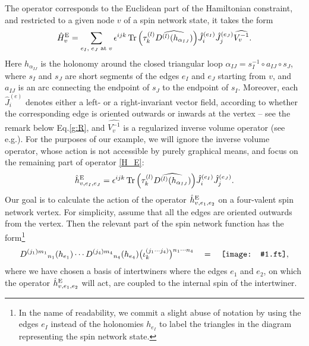 \documentclass[graybox, secnum]{svmult}
\makeatletter
\newcommand{\ft}{pdf}        %
\newcommand{\makeSymbol}[1]{\mathord{\vcenter{\hbox{#1}}}}
\newcommand{\Symbol}[1]{\makeSymbol{\texttt{[image: \#1.\\ft]}}}
\newcommand{\eg}{e.g.\@\xspace}
\newcommand{\Eq}[1]{Eq.\@\xspace\eqref{#1}}
\newcommand{\DD}[4]{{D^{(#1)#2}}_{#3}(#4)}
\makeatother
\begin{document}
The operator corresponds to the Euclidean part of the Hamiltonian constraint, and restricted to a given node $v$ of a spin network state, it takes the form
\begin{equation}
	\hat H^{\rm E}_v = \sum_{\text{$e_I$, $e_J$ at $v$}} \epsilon^{ijk}\,{\rm Tr}\,\Bigl(\tau_k^{(l)}\widehat{D^{(l)}(h_{\alpha_{IJ}})}\Bigr)\hat J_i^{(e_I)}\hat J_j^{(e_J)}\widehat{V_v^{-1}}.
	\label{H_E}
\end{equation}
Here $h_{\alpha_{IJ}}$ is the holonomy around the closed triangular loop $\alpha_{IJ} = s_I^{-1}\circ a_{IJ}\circ s_J$, where $s_I$ and $s_J$ are short segments of the edges $e_I$ and $e_J$ starting from $v$, and $a_{IJ}$ is an arc connecting the endpoint of $s_J$ to the endpoint of $s_I$. Moreover, each $\hat J_i^{(e)}$ denotes either a left- or a right-invariant vector field, according to whether the corresponding edge is oriented outwards or inwards at the vertex -- see the remark below \Eq{g:R}, and $\widehat{V_v^{-1}}$ is a regularized inverse volume operator (see \eg \cite{Bianchi:2008es, Yang:2021den}).
For the purposes of our example, we will ignore the inverse volume operator, whose action is not accessible by purely graphical means, and focus on the remaining part of operator \eqref{H_E}:
\begin{equation}
	\hat h^{\rm E}_{v, e_I, e_J} = \epsilon^{ijk}\,{\rm Tr}\,\Bigl(\tau_k^{(l)}\widehat{D^{(l)}(h_{\alpha_{IJ}})}\Bigr)\hat J_i^{(e_I)}\hat J_j^{(e_J)}.
	\label{h_E}
\end{equation}
Our goal is to calculate the action of the operator $\hat h^{\rm E}_{v, e_1, e_2}$ on a four-valent spin network vertex. For simplicity, assume that all the edges are oriented outwards from the vertex. Then the relevant part of the spin network function has the form\footnote{
	In the name of readability, we commit a slight abuse of notation by using the edges $e_I$ instead of the holonomies $h_{e_I}$ to label the triangles in the diagram representing the spin network state.
}
\begin{equation}
	\DD{j_1}{m_1}{n_1}{h_{e_1}} \cdots \DD{j_4}{m_4}{n_4}{h_{e_4}}\bigl(\iota^{(j_1\cdots j_4)}_k\bigr)^{n_1\cdots n_4} \quad = \quad \Symbol{4node-e},
	\label{4node}
\end{equation}
where we have chosen a basis of intertwiners where the edges $e_1$ and $e_2$, on which the operator $\hat h^{\rm E}_{v, e_1, e_2}$ will act, are coupled to the internal spin of the intertwiner.
\end{document}
